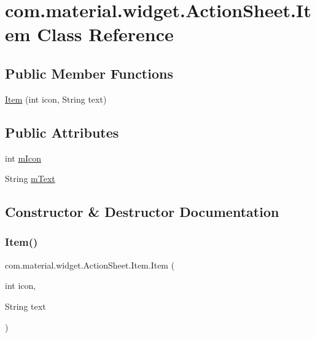 \hypertarget{classcom_1_1material_1_1widget_1_1_action_sheet_1_1_item}{}\section{com.\+material.\+widget.\+Action\+Sheet.\+Item Class Reference}
\label{classcom_1_1material_1_1widget_1_1_action_sheet_1_1_item}
\subsection*{Public Member Functions}
\begin{DoxyCompactItemize}
\item 
\hyperlink{classcom_1_1material_1_1widget_1_1_action_sheet_1_1_item_a8686b8a28e773c0375c8a1b8336c8e50}{Item} (int icon, String text)
\end{DoxyCompactItemize}
\subsection*{Public Attributes}
\begin{DoxyCompactItemize}
\item 
int \hyperlink{classcom_1_1material_1_1widget_1_1_action_sheet_1_1_item_aa7c90d941b5cbd5eb5caac9ac85e6620}{m\+Icon}
\item 
String \hyperlink{classcom_1_1material_1_1widget_1_1_action_sheet_1_1_item_a8ae8a8d7ef5cfb53228970af1b44d3e2}{m\+Text}
\end{DoxyCompactItemize}


\subsection{Constructor \& Destructor Documentation}
\mbox{\label{classcom_1_1material_1_1widget_1_1_action_sheet_1_1_item_a8686b8a28e773c0375c8a1b8336c8e50}} 
\subsubsection{\texorpdfstring{Item()}{Item()}}
{\footnotesize\ttfamily com.\+material.\+widget.\+Action\+Sheet.\+Item.\+Item (\begin{DoxyParamCaption}\item[{int}]{icon,  }\item[{String}]{text }\end{DoxyParamCaption})}




